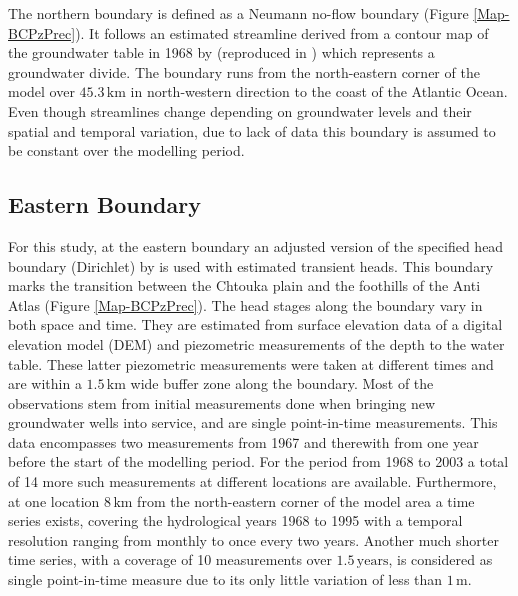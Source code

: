 
The northern boundary is defined as a Neumann no-flow boundary (Figure \ref{Map-BCPzPrec}). 
It follows an estimated streamline derived from a contour map of the groundwater table in 1968 by \textcite{Bernet.1968} (reproduced in \cite{Bernet.1977}) which represents a groundwater divide. 
The boundary runs from the north-eastern corner of the model over $45.3 \, \textrm{km}$ in north-western direction to the coast of the Atlantic Ocean. 
Even though streamlines change depending on groundwater levels and their spatial and temporal variation, due to lack of data this boundary is assumed to be constant over the modelling period.

\subsection{Eastern Boundary}

For this study, at the eastern boundary an adjusted version of the specified head boundary (Dirichlet) by \textcite{Horn.2021} is used with estimated transient heads. 
This boundary marks the transition between the Chtouka plain and the foothills of the Anti Atlas (Figure \ref{Map-BCPzPrec}). 
The head stages along the boundary vary in both space and time. 
They are estimated from surface elevation data of a digital elevation model (DEM) \parencite{NASA.SRTM1Arc} and piezometric measurements of the depth to the water table. 
These latter piezometric measurements were taken at different times and are within a $1.5 \, \textrm{km}$ wide buffer zone along the boundary. 
Most of the observations stem from initial measurements done when bringing new groundwater wells into service, and are single point-in-time measurements. 
This data encompasses two measurements from 1967 and therewith from one year before the start of the modelling period. 
For the period from 1968 to 2003 a total of 14 more such measurements at different locations are available. 
Furthermore, at one location $8 \, \textrm{km}$ from the north-eastern corner of the model area a time series exists, covering the hydrological years 1968 to 1995 with a temporal resolution ranging from monthly to once every two years. 
Another much shorter time series, with a coverage of 10 measurements over $1.5 \, \textrm{years}$, is considered as single point-in-time measure due to its only little variation of less than $1 \, \textrm{m}$.

